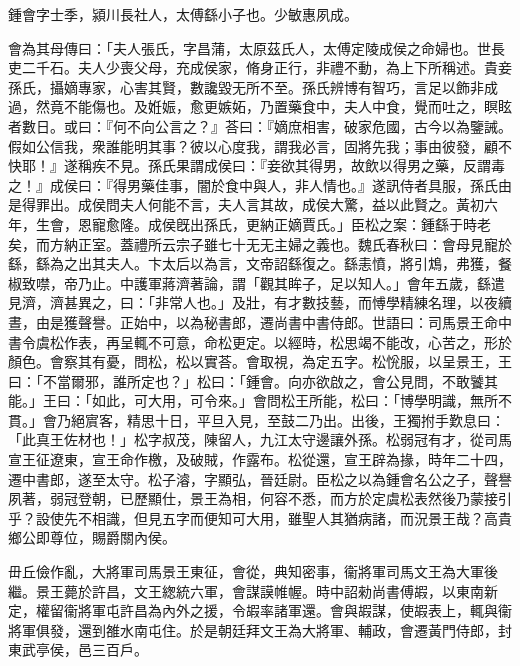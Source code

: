 
\begin{pinyinscope}
鍾會字士季，潁川長社人，太傅繇小子也。少敏惠夙成。

會為其母傳曰：「夫人張氏，字昌蒲，太原茲氏人，太傅定陵成侯之命婦也。世長吏二千石。夫人少喪父母，充成侯家，脩身正行，非禮不動，為上下所稱述。貴妾孫氏，攝嫡專家，心害其賢，數讒毀无所不至。孫氏辨博有智巧，言足以飾非成過，然竟不能傷也。及姙娠，愈更嫉妬，乃置藥食中，夫人中食，覺而吐之，瞑眩者數日。或曰：『何不向公言之？』荅曰：『嫡庶相害，破家危國，古今以為鑒誡。假如公信我，衆誰能明其事？彼以心度我，謂我必言，固將先我；事由彼發，顧不快耶！』遂稱疾不見。孫氏果謂成侯曰：『妾欲其得男，故飲以得男之藥，反謂毒之！』成侯曰：『得男藥佳事，闇於食中與人，非人情也。』遂訊侍者具服，孫氏由是得罪出。成侯問夫人何能不言，夫人言其故，成侯大驚，益以此賢之。黃初六年，生會，恩寵愈隆。成侯旣出孫氏，更納正嫡賈氏。」臣松之案：鍾繇于時老矣，而方納正室。蓋禮所云宗子雖七十无无主婦之義也。魏氏春秋曰：會母見寵於繇，繇為之出其夫人。卞太后以為言，文帝詔繇復之。繇恚憤，將引鴆，弗獲，餐椒致噤，帝乃止。中護軍蔣濟著論，謂「觀其眸子，足以知人。」會年五歲，繇遣見濟，濟甚異之，曰：「非常人也。」及壯，有才數技藝，而愽學精練名理，以夜續晝，由是獲聲譽。正始中，以為秘書郎，遷尚書中書侍郎。世語曰：司馬景王命中書令虞松作表，再呈輒不可意，命松更定。以經時，松思竭不能改，心苦之，形於顏色。會察其有憂，問松，松以實荅。會取視，為定五字。松恱服，以呈景王，王曰：「不當爾邪，誰所定也？」松曰：「鍾會。向亦欲啟之，會公見問，不敢饕其能。」王曰：「如此，可大用，可令來。」會問松王所能，松曰：「博學明識，無所不貫。」會乃絕賔客，精思十日，平旦入見，至鼓二乃出。出後，王獨拊手歎息曰：「此真王佐材也！」松字叔茂，陳留人，九江太守邊讓外孫。松弱冠有才，從司馬宣王征遼東，宣王命作檄，及破賊，作露布。松從還，宣王辟為掾，時年二十四，遷中書郎，遂至太守。松子濬，字顯弘，晉廷尉。臣松之以為鍾會名公之子，聲譽夙著，弱冠登朝，已歷顯仕，景王為相，何容不悉，而方於定虞松表然後乃蒙接引乎？設使先不相識，但見五字而便知可大用，雖聖人其猶病諸，而況景王哉？高貴鄉公即尊位，賜爵關內侯。

毌丘儉作亂，大將軍司馬景王東征，會從，典知密事，衞將軍司馬文王為大軍後繼。景王薨於許昌，文王緫統六軍，會謀謨帷幄。時中詔勑尚書傅嘏，以東南新定，權留衞將軍屯許昌為內外之援，令嘏率諸軍還。會與嘏謀，使嘏表上，輒與衞將軍俱發，還到雒水南屯住。於是朝廷拜文王為大將軍、輔政，會遷黃門侍郎，封東武亭侯，邑三百戶。


\end{pinyinscope}
